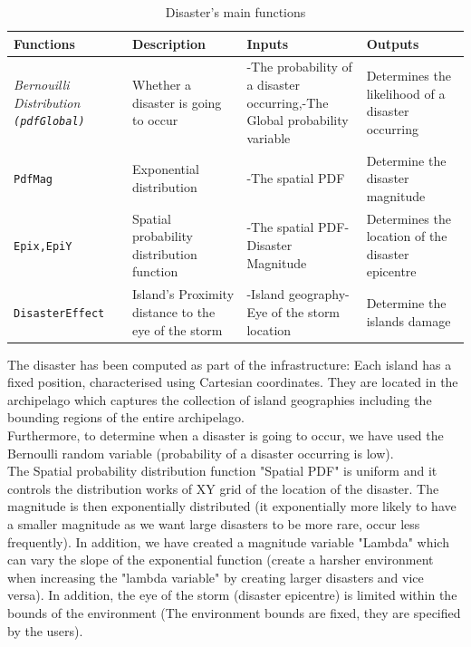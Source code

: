 \begin{table}[h]
\begin{center}
\begin{tabular}{|p{1.1in}|p{1.1in}|p{1.1in}|p{1.1in}|} \hline
\textbf{Functions} & \textbf{Description} & \textbf{Inputs} & \textbf{Outputs} \\ \hline
\textit{Bernouilli Distribution \texttt{(pdfGlobal)}} & Whether a disaster is going to occur & -The probability of a disaster occurring,\newline -The Global probability variable & Determines the likelihood of a disaster occurring \\ \hline
\texttt{PdfMag} & Exponential distribution & -The spatial PDF & Determine the disaster magnitude \\ \hline
\texttt{Epix,EpiY} & Spatial probability distribution function & -The spatial PDF\newline -Disaster Magnitude & Determines the location of the disaster epicentre \\ \hline
\texttt{DisasterEffect} & Island's Proximity distance to the eye of the storm & -Island geography\newline -Eye of the storm location & Determine the islands damage \\ \hline
\end{tabular}
\caption{\label{tab:table-name}Disaster's main functions}
\end{center}
\end{table}

The disaster has been computed as part of the infrastructure: Each island has a fixed position, characterised using Cartesian coordinates. They are located in the archipelago which captures the collection of island geographies including the bounding regions of the entire archipelago.\\

Furthermore, to determine when a disaster is going to occur, we have used the Bernoulli random variable (probability of a disaster occurring is low).\\

The Spatial probability distribution function "Spatial PDF" is uniform and it controls the distribution works of XY grid of the location of the disaster. The magnitude is then exponentially distributed (it exponentially more likely to have a smaller magnitude as we want large disasters to be more rare, occur less frequently). In addition, we have created a magnitude variable "Lambda" which can vary the slope of the exponential function (create a harsher environment when increasing the "lambda variable" by creating larger disasters and vice versa). In addition, the eye of the storm (disaster epicentre) is limited within the bounds of the environment (The environment bounds are fixed, they are specified by the users).\\

